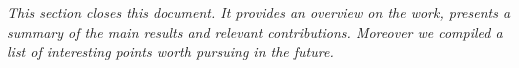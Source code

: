 \label{cap:conclusions}

\textit{This section closes this document. It provides an overview on the work, presents a summary of the main results and relevant contributions. Moreover we compiled a list of interesting points worth pursuing in the future.}

\cleardoublepage